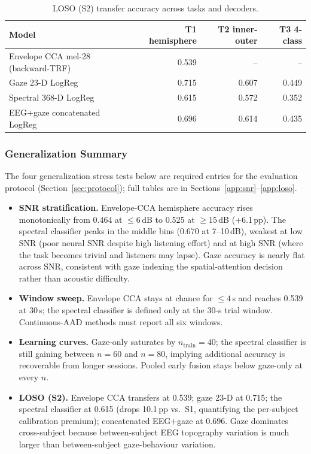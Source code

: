 \documentclass{article}
\begin{document}
\begin{table}[ht]
\centering
\small
\caption{LOSO (S2) transfer accuracy across tasks and decoders.}
\label{tab:loso}
\begin{tabular}{lrrr}
\toprule
Model & T1 hemisphere & T2 inner-outer & T3 4-class \\
\midrule
Envelope CCA mel-28 (backward-TRF) & 0.539 & --    & --    \\
Gaze 23-D LogReg                   & 0.715 & 0.607 & 0.449 \\
Spectral 368-D LogReg              & 0.615 & 0.572 & 0.352 \\
EEG$+$gaze concatenated LogReg     & 0.696 & 0.614 & 0.435 \\
\bottomrule
\end{tabular}
\end{table}

\subsubsection{Generalization Summary}
\label{app:sweeps}

The four generalization stress tests below are required entries for the
evaluation protocol (Section~\ref{sec:protocol}); full tables are in
Sections~\ref{app:snr}--\ref{app:loso}.

\begin{itemize}
\item \textbf{SNR stratification.} Envelope-CCA hemisphere accuracy rises
monotonically from 0.464 at $\le 6$\,dB to 0.525 at $\ge 15$\,dB
(+6.1\,pp). The spectral classifier peaks in the middle bins (0.670 at
7--10\,dB), weakest at low SNR (poor neural SNR despite high listening
effort) and at high SNR (where the task becomes trivial and listeners may
lapse). Gaze accuracy is nearly flat across SNR, consistent with gaze
indexing the spatial-attention decision rather than acoustic difficulty.

\item \textbf{Window sweep.} Envelope CCA stays at chance for $\le 4$\,s
and reaches 0.539 at 30\,s; the spectral classifier is defined only at the
30-s trial window. Continuous-AAD methods must report all six windows.

\item \textbf{Learning curves.} Gaze-only saturates by $n_\text{train}{=}40$;
the spectral classifier is still gaining between $n{=}60$ and $n{=}80$,
implying additional accuracy is recoverable from longer sessions. Pooled
early fusion stays below gaze-only at every $n$.

\item \textbf{LOSO (S2).} Envelope CCA transfers at 0.539; gaze 23-D at
0.715; the spectral classifier at 0.615 (drops 10.1\,pp vs.\ S1,
quantifying the per-subject calibration premium); concatenated EEG$+$gaze
at 0.696. Gaze dominates cross-subject because between-subject EEG
topography variation is much larger than between-subject gaze-behaviour
variation.
\end{itemize}
\end{document}
